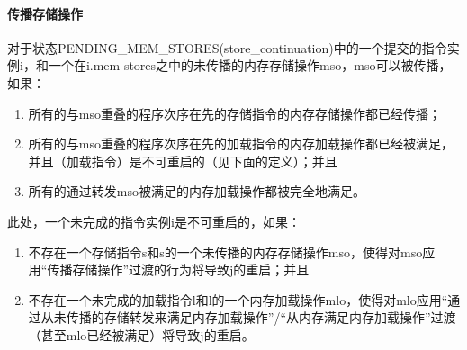 \paragraph{传播存储操作}\label{omm:prop_store}
对于状态PENDING_MEM_STORES(store_continuation)中的一个提交的指令实例i，和一个在i.mem stores之中的未传播的内存存储操作mso，mso可以被传播，如果：
\begin{enumerate}
\item 所有的与mso重叠的程序次序在先的存储指令的内存存储操作都已经传播；  %
\item 所有的与mso重叠的程序次序在先的加载指令的内存加载操作都已经被满足，并且（加载指令）是不可重启的（见下面的定义）；并且  %
\item 所有的通过转发mso被满足的内存加载操作都被完全地满足。  %
\end{enumerate}
此处，一个未完成的指令实例i是不可重启的，如果：
\begin{enumerate}
\item 不存在一个存储指令s和s的一个未传播的内存存储操作mso，使得对mso应用“传播存储操作”过渡的行为将导致j的重启；并且 %
\item 不存在一个未完成的加载指令l和l的一个内存加载操作mlo，使得对mlo应用“通过从未传播的存储转发来满足内存加载操作”/“从内存满足内存加载操作”过渡（甚至mlo已经被满足）将导致j的重启。  %
\end{enumerate}
